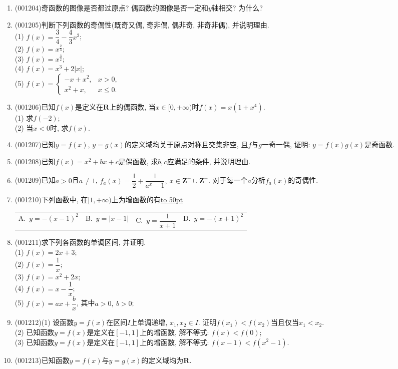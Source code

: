 \documentclass[10pt,a4paper]{article}
\newcommand{\blank}[1]{\underline{\hbox to #1pt{}}}
\newcommand{\fourch}[4]{\par\begin{tabular}{p{.23\textwidth}p{.23\textwidth}p{.23\textwidth}p{.23\textwidth}}
A.~#1 &B.~#2& C.~#3& D.~#4
\end{tabular}}
\begin{document}
\begin{enumerate}[1.]
\item {\tiny (001204)}奇函数的图像是否都过原点? 偶函数的图像是否一定和$y$轴相交? 为什么?
\item {\tiny (001205)}判断下列函数的奇偶性(既奇又偶, 奇非偶, 偶非奇, 非奇非偶), 并说明理由.\\ 
(1) $f(x)=\dfrac{3}{4}-\dfrac{4}{3}x^2$;\\ 
(2) $f(x)=x^{\frac{2}{3}}$;\\ 
(3) $f(x)=x^{\frac{3}{2}}$;\\ 
(4) $f(x)=x^3+2|x|$;\\ 
(5) $f(x)=\left\{\begin{array}{ll}-x+x^2,& x>0,\\x^2+x,& x\le 0.\end{array}\right.$
\item {\tiny (001206)}已知$f(x)$是定义在$\mathbf{R}$上的偶函数, 当$x\in [0,+\infty)$时$f(x)=x(1+x^4)$.\\ 
(1) 求$f(-2)$;\\ 
(2) 当$x<0$时, 求$f(x)$.
\item {\tiny (001207)}已知$y=f(x)$, $y=g(x)$的定义域均关于原点对称且交集非空, 且$f$与$g$一奇一偶, 证明: $y=f(x)g(x)$是奇函数.
\item {\tiny (001208)}已知$f(x)=x^2+bx+c$是偶函数, 求$b,c$应满足的条件, 并说明理由.
\item {\tiny (001209)}已知$a>0$且$a\ne 1$, $f_a(x)=\dfrac{1}{2}+\dfrac{1}{a^x-1},\ x \in \mathbf{Z}^+\cup \mathbf{Z}^-$. 对于每一个$a$分析$f_a(x)$的奇偶性.
\item {\tiny (001210)}下列函数中, 在$[1,+\infty)$上为增函数的有\blank{50}
\fourch{$y=-(x-1)^2$}{$y=|x-1|$}{$y=\dfrac{1}{x+1}$}{$y=-(x+1)^2$}
\item {\tiny (001211)}求下列各函数的单调区间, 并证明.\\ 
(1) $f(x)=2x+3$;\\ 
(2) $f(x)=\dfrac{1}{x}$;\\ 
(3) $f(x)=x^2+2x$;\\ 
(4) $f(x)=x-\dfrac{1}{x}$;\\ 
(5) $f(x)=ax+\dfrac{b}{x}$, 其中$a>0, \ b>0$;
\item {\tiny (001212)}(1) 设函数$y=f(x)$在区间$I$上单调递增, $x_1,x_2\in I$. 证明$f(x_1)<f(x_2)$当且仅当$x_1<x_2$.\\ 
(2) 已知函数$y=f(x)$是定义在$[-1,1]$上的增函数, 解不等式: $f(x)<f(0)$;\\ 
(3) 已知函数$y=f(x)$是定义在$[-1,1]$上的增函数, 解不等式: $f(x-1)<f(x^2-1)$.
\item {\tiny (001213)}已知函数$y=f(x)$与$y=g(x)$的定义域均为$\mathbf{R}$.\\ 

\end{enumerate}
\end{document}
